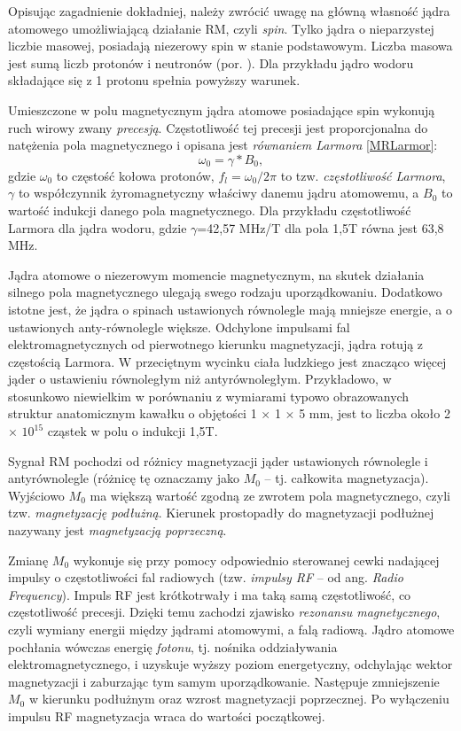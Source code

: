 Opisując zagadnienie dokładniej, należy zwrócić uwagę na główną własność jądra atomowego umożliwiającą działanie RM, czyli \textit{spin}. Tylko jądra o nieparzystej liczbie masowej, posiadają niezerowy spin w stanie podstawowym. Liczba masowa jest sumą liczb protonów i neutronów (por. \cite{RM2015}). Dla przykładu jądro wodoru składające się z 1 protonu spełnia powyższy warunek. 

Umieszczone w polu magnetycznym jądra atomowe posiadające spin wykonują ruch wirowy zwany \textit{precesją}. Częstotliwość tej precesji jest proporcjonalna do natężenia pola magnetycznego i opisana jest \textit{równaniem Larmora} \ref{MRLarmor}:
\begin{equation}
\label{MRLarmor}
\omega_0 = \gamma \ast B_0,
\end{equation}
gdzie $\omega_0$ to częstość kołowa protonów, $f_l = \omega_0/2\pi$ to tzw. \textit{częstotliwość Larmora}, $\gamma$ to współczynnik żyromagnetyczny właściwy danemu jądru atomowemu, a $B_0$ to wartość indukcji danego pola magnetycznego. Dla przykładu częstotliwość Larmora dla jądra wodoru, gdzie $\gamma$=42,57 MHz/T dla pola 1,5T równa jest 63,8 MHz. 

Jądra atomowe o niezerowym momencie magnetycznym, na skutek działania silnego pola magnetycznego ulegają swego rodzaju uporządkowaniu. Dodatkowo istotne jest, że jądra o spinach ustawionych równolegle mają mniejsze energie, a o ustawionych anty-równolegle większe. Odchylone impulsami fal elektromagnetycznych od pierwotnego kierunku magnetyzacji, jądra rotują z częstością Larmora. W przeciętnym wycinku ciała ludzkiego jest znacząco więcej jąder o ustawieniu równoległym niż antyrównoległym. Przykładowo, w stosunkowo niewielkim w porównaniu z wymiarami typowo obrazowanych struktur anatomicznym kawałku o objętości 1 $\times$ 1 $\times$ 5 mm, jest to liczba około 2 $\times$ $10^{15}$ cząstek w polu o indukcji 1,5T. 

Sygnał RM pochodzi od różnicy magnetyzacji jąder ustawionych równolegle i antyrównolegle (różnicę tę oznaczamy jako $M_0$ -- tj. całkowita magnetyzacja). Wyjściowo $M_0$ ma większą wartość zgodną ze zwrotem pola magnetycznego, czyli tzw. \textit{magnetyzację podłużną}. Kierunek prostopadły do magnetyzacji podłużnej nazywany jest \textit{magnetyzacją poprzeczną}.

Zmianę $M_0$ wykonuje się przy pomocy odpowiednio sterowanej cewki nadającej impulsy o częstotliwości fal radiowych (tzw. \textit{impulsy RF} -- od ang. \textit{Radio Frequency}). Impuls RF jest krótkotrwały i ma taką samą częstotliwość, co częstotliwość precesji. Dzięki temu zachodzi zjawisko \textit{rezonansu magnetycznego}, czyli wymiany energii między jądrami atomowymi, a falą radiową. Jądro atomowe pochłania wówczas energię \textit{fotonu}, tj. nośnika oddziaływania elektromagnetycznego, i uzyskuje wyższy poziom energetyczny, odchylając wektor magnetyzacji i zaburzając tym samym uporządkowanie. Następuje zmniejszenie $M_0$ w kierunku podłużnym oraz wzrost magnetyzacji poprzecznej. Po wyłączeniu impulsu RF magnetyzacja wraca do wartości początkowej. 

